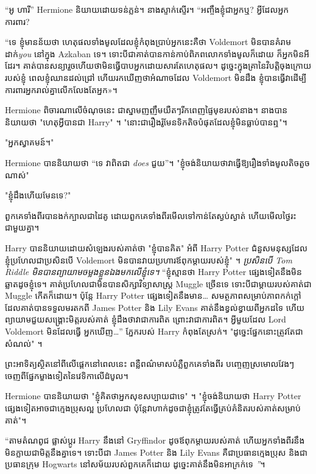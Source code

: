 {{{{“អូ ហារី” Hermione និយាយដោយទន់ភ្លន់។ នាងស្ទាក់ស្ទើរ។ “អញ្ចឹង​ខ្ញុំ​ជា​អ្នក​ឬ? អ្វីដែលអ្នកការពារ?

“ទេ ខ្ញុំមានន័យថា ហេតុផលទាំងមូលដែលខ្ញុំកំពុងប្រាប់អ្នកនេះគឺថា Voldemort មិនបានគំរាមដាក់\emph{you} នៅក្នុង Azkaban ទេ។ ទោះបីជាគាត់បានកាន់កាប់ពិភពលោកទាំងមូលក៏ដោយ ក៏អ្នកមិនអីដែរ។ គាត់​បាន​សន្យា​រួច​ហើយ​ថា​មិន​ធ្វើ​បាប​អ្នក​ដោយ​សារ​តែ​ហេតុផល។ ដូច្នេះ​ក្នុង​គ្រា​នៃ​វិបត្តិ​ចុងក្រោយ​របស់​ខ្ញុំ ពេល​ខ្ញុំ​ឈាន​ដល់​ជ្រៅ ហើយ​រក​ឃើញ​ថា​អំណាច​ដែល Voldemort មិន​ដឹង ខ្ញុំ​បាន​ធ្វើ​វា​ដើម្បី​ការពារ​អ្នក​រាល់​គ្នា​លើក​លែង​តែ​អ្នក»។

Hermione ពិចារណា​លើ​ចំណុច​នេះ ជា​ស្នាម​ញញឹម​យឺតៗ​រីក​ពេញ​ផ្ទៃ​មុខ​របស់​នាង។ នាងបាននិយាយថា "ហេតុអ្វីបានជា Harry" ។ "នោះ​ជា​រឿង​រ៉ូមែនទិក​តិច​បំផុត​ដែល​ខ្ញុំ​មិន​ធ្លាប់​បាន​ឮ"។

"អ្នកស្វាគមន៍។"

Hermione បាននិយាយថា “ទេ វាពិតជា \emph{does} ជួយ”។ "ខ្ញុំ​ចង់​និយាយ​ថា​វា​ធ្វើ​ឱ្យ​រឿង​ទាំង​មូល​តិច​តួច​ណាស់"

"ខ្ញុំដឹងហើយមែនទេ?"

ពួកគេទាំងពីរបានងក់ក្បាលជាដៃគូ ដោយពួកគេទាំងពីរមើលទៅកាន់តែស្ងប់ស្ងាត់ ហើយមើលថ្ងៃរះជាមួយគ្នា។

Harry បាននិយាយដោយសំឡេងរបស់គាត់ថា "ខ្ញុំបានគិត" អំពី Harry Potter ជំនួសមនុស្សដែលខ្ញុំប្រហែលជាប្រសិនបើ Voldemort មិនបានវាយប្រហារឪពុកម្តាយរបស់ខ្ញុំ" ។ \emph{ប្រសិនបើ Tom Riddle មិនបានព្យាយាមចម្លងខ្លួនឯងមកលើខ្ញុំទេ។} “ខ្ញុំស្មានថា Harry Potter ផ្សេងទៀតនឹងមិនឆ្លាតដូចខ្ញុំទេ។ គាត់ប្រហែលជាមិនបានសិក្សាវិទ្យាសាស្ត្រ Muggle ច្រើនទេ ទោះបីជាម្តាយរបស់គាត់ជា Muggle កើតក៏ដោយ។ ប៉ុន្តែ Harry Potter ផ្សេងទៀតនឹងមាន… សមត្ថភាពសម្រាប់ភាពកក់ក្តៅ ដែលគាត់បានទទួលមរតកពី James Potter និង Lily Evans គាត់នឹងខ្វល់ខ្វាយពីអ្នកដទៃ ហើយព្យាយាមជួយសង្គ្រោះមិត្តរបស់គាត់ ខ្ញុំដឹងថាវាជាការពិត ព្រោះវាជាការពិត។ អ្វីមួយដែល Lord Voldemort មិនដែលធ្វើ អ្នកឃើញ…” ភ្នែករបស់ Harry កំពុងតែស្រក់។ "ដូច្នេះផ្នែកនោះត្រូវតែជាសំណល់" ។

ព្រះអាទិត្យស្ថិតនៅពីលើផ្តេកនៅពេលនេះ ពន្លឺពណ៌មាសបំភ្លឺពួកគេទាំងពីរ បញ្ចេញស្រមោលវែងៗចេញពីផ្នែកម្ខាងទៀតនៃវេទិកាលើដំបូល។

Hermione បាននិយាយថា "ខ្ញុំគិតថាអ្នកសុខសប្បាយជាទេ" ។ "ខ្ញុំចង់និយាយថា Harry Potter ផ្សេងទៀតអាចជាក្មេងប្រុសល្អ ប្រហែលជា ប៉ុន្តែវាហាក់ដូចជាខ្ញុំត្រូវតែធ្វើគ្រប់គំនិតរបស់គាត់សម្រាប់គាត់"។

“តាមតំណពូជ ផ្លាស់ប្តូរ Harry នឹងនៅ Gryffindor ដូចឪពុកម្តាយរបស់គាត់ ហើយអ្នកទាំងពីរនឹងមិនក្លាយជាមិត្តនឹងគ្នាទេ។ ទោះបីជា James Potter និង Lily Evans គឺជាប្រធានក្មេងប្រុស និងជាប្រធានក្រុម Hogwarts នៅសម័យរបស់ពួកគេក៏ដោយ ដូច្នេះគាត់នឹងមិនអាក្រក់ទេ \emph”។

}}}}
